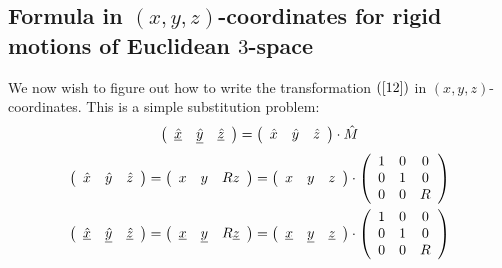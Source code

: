 \subsection*{Formula in $\left(  x,y,z\right)  $-coordinates for rigid motions
of Euclidean $3$-space}

We now wish to figure out how to write the transformation $\left(
\ref{12}\right)  $ in $\left(  x,y,z\right)  $-coordinates. This is a simple
substitution problem:%
\begin{equation}
\left(
\begin{array}
[c]{ccc}%
\underline{\hat{x}} & \underline{\hat{y}} & \underline{\hat{z}}%
\end{array}
\right)  =\left(
\begin{array}
[c]{ccc}%
\hat{x} & \hat{y} & \hat{z}%
\end{array}
\right)  \cdot\hat{M} \label{100}%
\end{equation}%
\begin{gather*}
\left(
\begin{array}
[c]{ccc}%
\hat{x} & \hat{y} & \hat{z}%
\end{array}
\right)  =\left(
\begin{array}
[c]{ccc}%
x & y & Rz
\end{array}
\right)  =\left(
\begin{array}
[c]{ccc}%
x & y & z
\end{array}
\right)  \cdot\left(
\begin{array}
[c]{ccc}%
1 & 0 & 0\\
0 & 1 & 0\\
0 & 0 & R
\end{array}
\right) \\
\left(
\begin{array}
[c]{ccc}%
\underline{\hat{x}} & \underline{\hat{y}} & \underline{\hat{z}}%
\end{array}
\right)  =\left(
\begin{array}
[c]{ccc}%
\underline{x} & \underline{y} & R\underline{z}%
\end{array}
\right)  =\left(
\begin{array}
[c]{ccc}%
\underline{x} & \underline{y} & \underline{z}%
\end{array}
\right)  \cdot\left(
\begin{array}
[c]{ccc}%
1 & 0 & 0\\
0 & 1 & 0\\
0 & 0 & R
\end{array}
\right)
\end{gather*}
